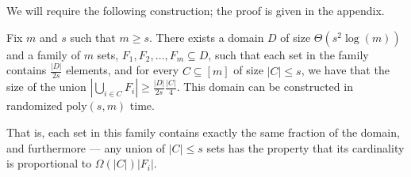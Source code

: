 \documentclass[prodmode,acmec]{ec-acmsmall}
\newcommand{\poly}{\ensuremath{\mathrm{poly}}}
\begin{document}
We will require the following construction; the proof is given in the appendix. 

\begin{lemma}\label{clm:FamilyOfSetsWithLargeUnions}
Fix $m$ and $s$ such that $m\geq s$. There exists a domain $D$ of size $\Theta(s^2\log(m))$ and a family of $m$ sets, $F_1, F_2, \ldots, F_m\subseteq D$, such that each set in the family contains $\tfrac {|D|}{2s}$ elements, and for every $C\subseteq [m]$ of size $|C| \leq s$, we have that the size of the union $\left| \bigcup_{i\in C} F_i \right| \geq \tfrac {|D|}{2s} \tfrac{|C|} 4$. This domain can be constructed in randomized $\poly(s,m)$ time.
\end{lemma}

That is, each set in this family contains exactly the same fraction of the domain, and furthermore --- any union of $|C| \leq s$ sets has the property that its cardinality is proportional to $\Omega(|C|) |F_i|$. 
\end{document}
